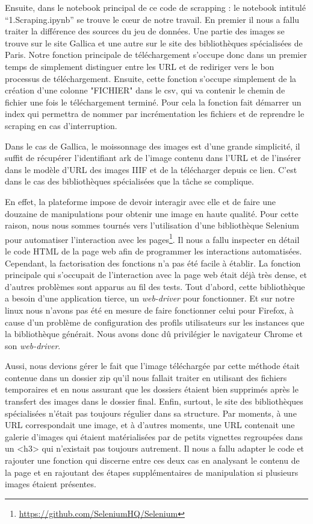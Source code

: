 Ensuite, dans le notebook principal de ce code de scrapping : le notebook intitulé \enquote{1.Scraping.ipynb} se trouve le cœur de notre travail. En premier il nous a fallu traiter la différence des sources du jeu de données. Une partie des images se trouve sur le site Gallica et une autre sur le site des bibliothèques spécialisées de Paris. Notre fonction principale de téléchargement s'occupe donc dans un premier temps de simplement distinguer entre les URL et de rediriger vers le bon processus de téléchargement. Ensuite, cette fonction s'occupe simplement de la création d'une colonne "FICHIER" dans le csv, qui va contenir le chemin de fichier une fois le téléchargement terminé. Pour cela la fonction fait démarrer un index qui permettra de nommer par incrémentation les fichiers et de reprendre le scraping en cas d'interruption.

Dans le cas de Gallica, le moissonnage des images est d'une grande simplicité, il suffit de récupérer l'identifiant ark de l'image contenu dans l'URL et de l'insérer dans le modèle d'URL des images IIIF et de la télécharger depuis ce lien. C'est dans le cas des bibliothèques spécialisées que la tâche se complique. 

En effet, la plateforme impose de devoir interagir avec elle et de faire une douzaine de manipulations pour obtenir une image en haute qualité. Pour cette raison, nous nous sommes tournés vers l'utilisation d'une bibliothèque Selenium pour automatiser l'interaction avec les pages\footnote{\url{https://github.com/SeleniumHQ/Selenium}}. Il nous a fallu inspecter en détail le code HTML de la page web afin de programmer les interactions automatisées. Cependant, la factorisation des fonctions n'a pas été facile à établir. La fonction principale qui s'occupait de l'interaction avec la page web était déjà très dense, et d'autres problèmes sont apparus au fil des tests. Tout d'abord, cette bibliothèque a besoin d'une application tierce, un \textit{web-driver} pour fonctionner. Et sur notre linux nous n'avons pas été en mesure de faire fonctionner celui pour Firefox, à cause d'un problème de configuration des profils utilisateurs sur les instances que la bibliothèque générait. Nous avons donc dû privilégier le navigateur Chrome et son \textit{web-driver}. 

Aussi, nous devions gérer le fait que l'image téléchargée par cette méthode était contenue dans un dossier zip qu'il nous fallait traiter en utilisant des fichiers temporaires et en nous assurant que les dossiers étaient bien supprimés après le transfert des images dans le dossier final. Enfin, surtout, le site des bibliothèques spécialisées n'était pas toujours régulier dans sa structure. Par moments, à une URL correspondait une image, et à d'autres moments, une URL contenait une galerie d'images qui étaient matérialisées par de petits vignettes regroupées dans un <h3> qui n'existait pas toujours autrement. Il nous a fallu adapter le code et rajouter une fonction qui discerne entre ces deux cas en analysant le contenu de la page et en rajoutant des étapes supplémentaires de manipulation si plusieurs images étaient présentes.

